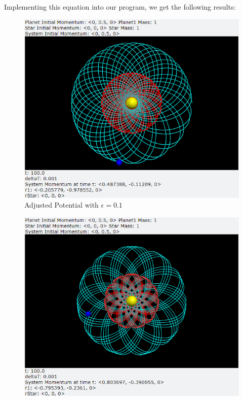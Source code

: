 \documentclass[12pt]{article}
\begin{document}
\begin{enumerate}
        Implementing this equation into our program, we get the following results:
        \begin{figure}[H]
            \begin{center}
               \includegraphics[scale=.5]{TwoBody6.png}
               \caption{Adjusted Potential with $\epsilon = 0.1$}
               \label{fig:TwoBody6}
            \end{center}
        \end{figure}
        \begin{figure}[H]
            \begin{center}
               \includegraphics[scale=.5]{TwoBody7.png}

\end{center}
\end{figure}
\end{enumerate}
\end{document}
